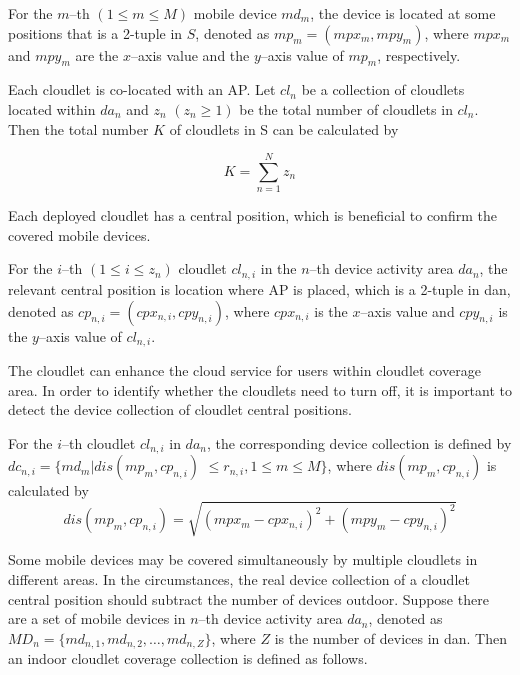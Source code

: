 \documentclass{llncs}
\begin{document}
\begin{definition}
For the $m$--th $(1 \leq m \leq M)$ mobile device $md_{m}$, the device is located at some positions that is a 2-tuple in $S$, denoted as $mp_m = (mpx_m, mpy_m)$, where $mpx_m$ and $mpy_m$ are the $x$--axis value and the $y$--axis value of $mp_m$, respectively.
\end{definition}

Each cloudlet is co-located with an AP. Let $cl_n$ be a collection of cloudlets located within $da_n$ and $z_n$ $(z_n \geq 1)$ be the total number of cloudlets in $cl_n$. Then the total number $K$ of cloudlets in S can be calculated by

\begin{equation}
  K = \sum_{n=1}^{N}z_n
\end{equation}

Each deployed cloudlet has a central position, which is beneficial to confirm the covered mobile devices.

\begin{definition}
For the $i$--th $(1 \leq i \leq z_n)$ cloudlet $cl_{n,i}$ in the $n$--th device activity area $da_n$, the relevant central position is location where AP is placed, which is a 2-tuple in dan, denoted as $cp_{n,i}= (cpx_{n,i}, cpy_{n,i})$, where $cpx_{n,i}$ is the $x$--axis value and $cpy_{n,i}$ is the $y$--axis value of $cl_{n,i}$.
\end{definition}

The cloudlet can enhance the cloud service for users within cloudlet coverage area. In order to identify whether the cloudlets need to turn off, it is important to detect the device collection of cloudlet central positions.

\begin{definition}
For the $i$--th cloudlet $cl_{n,i}$ in $da_n$, the corresponding device collection is defined by $dc_{n,i} = \{md_m| dis(mp_m, cp_{n,i})$ $\leq r_{n,i}, 1 \leq m \leq M\}$, where $dis(mp_m, cp_{n,i})$ is calculated by
\begin{equation}
dis(mp_m, cp_{n,i}) = \sqrt{(mpx_m - cpx_{n,i})^2 + (mpy_m - cpy_{n,i})^2}
\end{equation}
\end{definition}

Some mobile devices may be covered simultaneously by multiple cloudlets in different areas. In the circumstances, the real device collection of a cloudlet central position should subtract the number of devices outdoor. Suppose there are a set of mobile devices in $n$--th device activity area $da_n$, denoted as $MD_n = \{md_{n,1}, md_{n,2},\dots, md_{n,Z}\}$, where $Z$ is the number of devices in dan. Then an indoor cloudlet coverage collection is defined as follows.
\end{document}

